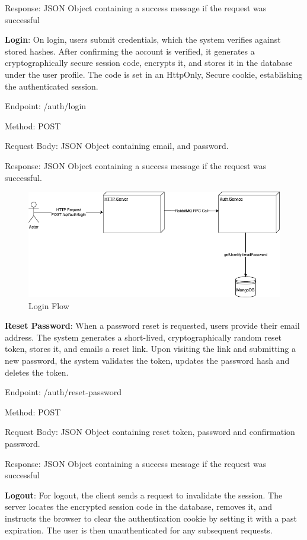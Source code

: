 Response: JSON Object containing a success message if the request was successful


\textbf{Login}: On login, users submit credentials, which the system verifies against stored hashes. After confirming the account is verified, it generates a cryptographically secure session code, encrypts it, and stores it in the database under the user profile. The code is set in an HttpOnly, Secure cookie\cite{COOKIES}, establishing the authenticated session.

Endpoint: /auth/login

Method: POST

Request Body: JSON Object containing email, and password.

Response: JSON Object containing a success message if the request was successful.

\begin{figure}[H]
  \centering
  \includegraphics[width=1\linewidth]{licenta-login.drawio.png}
  \caption*{Login Flow}
  \label{fig:login-flow}
\end{figure}

\textbf{Reset Password}: When a password reset is requested, users provide their email address. The system generates a short-lived, cryptographically random reset token, stores it, and emails a reset link. Upon visiting the link and submitting a new password, the system validates the token, updates the password hash and deletes the token.

Endpoint: /auth/reset-password

Method: POST

Request Body: JSON Object containing reset token, password and confirmation password.

Response: JSON Object containing a success message if the request was successful


\textbf{Logout}: For logout, the client sends a request to invalidate the session. The server locates the encrypted session code in the database, removes it, and instructs the browser to clear the authentication cookie by setting it with a past expiration. The user is then unauthenticated for any subsequent requests.

